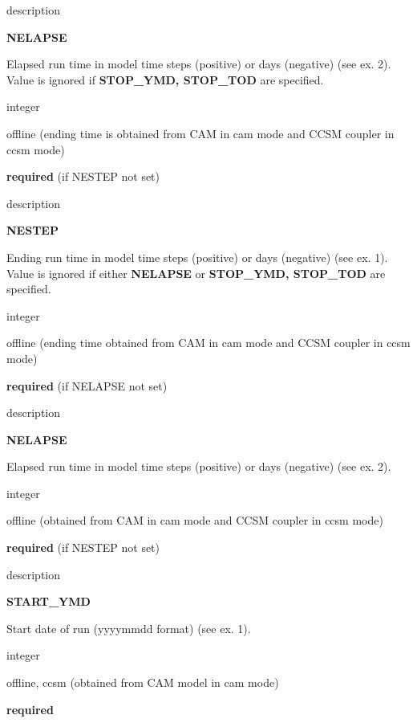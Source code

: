 \begin{Ventry}{description}
 \item[{\bf name}]  {\bf NELAPSE}  
 \item[description]  Elapsed run time in model time steps (positive) or days (negative) (see ex. 2). 
	Value is ignored if {\bf STOP\_YMD, STOP\_TOD} are specified.
 \item[type]     integer       
 \item[mode]     offline (ending time is obtained from CAM in cam mode and CCSM coupler in ccsm mode)
 \item[default] {\bf required} (if NESTEP  not set)  
\end{Ventry}
\medskip

\begin{Ventry}{description}
 \item[{\bf name}]   {\bf NESTEP}   
 \item[description]  Ending run time in model time steps (positive) or days (negative) (see ex. 1). 
	Value is ignored if either {\bf NELAPSE} or {\bf STOP\_YMD, STOP\_TOD} are specified.
 \item[type]  integer       
 \item[mode]     offline (ending time obtained from CAM in cam mode and CCSM coupler in ccsm mode)
 \item[default]  {\bf required} (if NELAPSE not set)  
\end{Ventry}
\medskip

\begin{Ventry}{description}
 \item[{\bf name}]  {\bf NELAPSE}  
 \item[description]  Elapsed run time in model time steps (positive) or days (negative) (see ex. 2). 
 \item[type]     integer       
 \item[mode]     offline (obtained from CAM in cam mode and CCSM coupler in ccsm mode)
 \item[default] {\bf required} (if NESTEP  not set)  
\end{Ventry}
\medskip

\begin{Ventry}{description}
 \item[{\bf name}] {\bf START\_YMD} 
 \item[description]  Start date of run (yyyymmdd format) (see ex. 1). 
 \item[type] integer 
 \item[mode] offline, ccsm  (obtained from CAM model in cam mode) 
 \item[default] {\bf required}      
\end{Ventry}
\medskip

